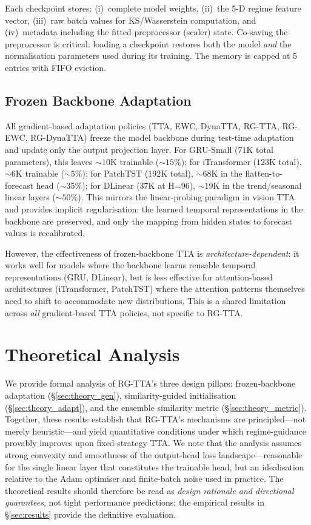 \documentclass[11pt,a4paper]{article}
\begin{document}
Each checkpoint stores: (i)~complete model weights, (ii)~the 5-D regime feature vector, (iii)~raw batch values for KS/Wasserstein computation, and (iv)~metadata including the fitted preprocessor (scaler) state. Co-saving the preprocessor is critical: loading a checkpoint restores both the model \emph{and} the normalisation parameters used during its training. The memory is capped at 5 entries with FIFO eviction.

\subsection{Frozen Backbone Adaptation}
\label{sec:frozen}

All gradient-based adaptation policies (TTA, EWC, DynaTTA, RG-TTA, RG-EWC, RG-DynaTTA) freeze the model backbone during test-time adaptation and update only the output projection layer. For GRU-Small ($71$K total parameters), this leaves $\sim10$K trainable ($\sim15\%$); for iTransformer ($123$K total), $\sim6$K trainable ($\sim5\%$); for PatchTST ($192$K total), $\sim68$K in the flatten-to-forecast head ($\sim35\%$); for DLinear ($37$K at H=96), $\sim19$K in the trend/seasonal linear layers ($\sim50\%$). This mirrors the linear-probing paradigm in vision TTA and provides implicit regularisation: the learned temporal representations in the backbone are preserved, and only the mapping from hidden states to forecast values is recalibrated.

However, the effectiveness of frozen-backbone TTA is \emph{architecture-dependent}: it works well for models where the backbone learns reusable temporal representations (GRU, DLinear), but is less effective for attention-based architectures (iTransformer, PatchTST) where the attention patterns themselves need to shift to accommodate new distributions. This is a shared limitation across \emph{all} gradient-based TTA policies, not specific to RG-TTA.


\section{Theoretical Analysis}
\label{sec:theory}

We provide formal analysis of RG-TTA's three design pillars: frozen-backbone adaptation (\S\ref{sec:theory_gen}), similarity-guided initialisation (\S\ref{sec:theory_adapt}), and the ensemble similarity metric (\S\ref{sec:theory_metric}). Together, these results establish that RG-TTA's mechanisms are principled---not merely heuristic---and yield quantitative conditions under which regime-guidance provably improves upon fixed-strategy TTA. We note that the analysis assumes strong convexity and smoothness of the output-head loss landscape---reasonable for the single linear layer that constitutes the trainable head, but an idealisation relative to the Adam optimiser and finite-batch noise used in practice. The theoretical results should therefore be read as \emph{design rationale and directional guarantees}, not tight performance predictions; the empirical results in \S\ref{sec:results} provide the definitive evaluation.
\end{document}
